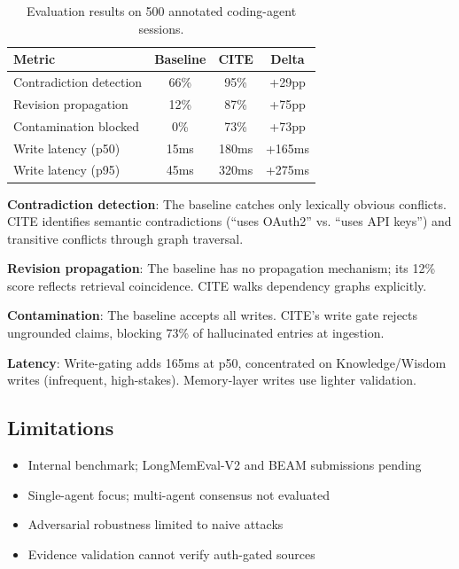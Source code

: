 \documentclass[11pt,letterpaper]{article}
\begin{document}
\begin{table}[H]
\centering
\caption{Evaluation results on 500 annotated coding-agent sessions.}
\label{tab:results}
\begin{tabular}{@{}lccc@{}}
\toprule
\textbf{Metric} & \textbf{Baseline} & \textbf{CITE} & \textbf{Delta} \\
\midrule
Contradiction detection & 66\% & 95\% & +29pp \\
Revision propagation & 12\% & 87\% & +75pp \\
Contamination blocked & 0\% & 73\% & +73pp \\
Write latency (p50) & 15ms & 180ms & +165ms \\
Write latency (p95) & 45ms & 320ms & +275ms \\
\bottomrule
\end{tabular}
\end{table}

\textbf{Contradiction detection}: The baseline catches only lexically obvious conflicts. CITE identifies semantic contradictions (``uses OAuth2'' vs. ``uses API keys'') and transitive conflicts through graph traversal.

\textbf{Revision propagation}: The baseline has no propagation mechanism; its 12\% score reflects retrieval coincidence. CITE walks dependency graphs explicitly.

\textbf{Contamination}: The baseline accepts all writes. CITE's write gate rejects ungrounded claims, blocking 73\% of hallucinated entries at ingestion.

\textbf{Latency}: Write-gating adds 165ms at p50, concentrated on Knowledge/Wisdom writes (infrequent, high-stakes). Memory-layer writes use lighter validation.

\subsection{Limitations}

\begin{itemize}[noitemsep]
    \item Internal benchmark; LongMemEval-V2 and BEAM submissions pending
    \item Single-agent focus; multi-agent consensus not evaluated
    \item Adversarial robustness limited to naive attacks
    \item Evidence validation cannot verify auth-gated sources
\end{itemize}
\end{document}
